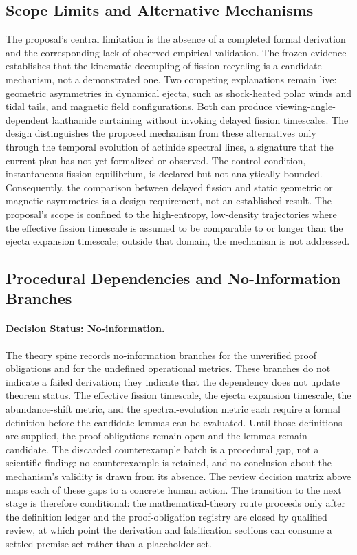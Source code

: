 \documentclass[conference]{IEEEtran}
\begin{document}
\subsection{Scope Limits and Alternative Mechanisms}
The proposal's central limitation is the absence of a completed formal derivation and the corresponding lack of observed empirical validation. The frozen evidence establishes that the kinematic decoupling of fission recycling is a candidate mechanism, not a demonstrated one. Two competing explanations remain live: geometric asymmetries in dynamical ejecta, such as shock-heated polar winds and tidal tails, and magnetic field configurations. Both can produce viewing-angle-dependent lanthanide curtaining without invoking delayed fission timescales. The design distinguishes the proposed mechanism from these alternatives only through the temporal evolution of actinide spectral lines, a signature that the current plan has not yet formalized or observed. The control condition, instantaneous fission equilibrium, is declared but not analytically bounded. Consequently, the comparison between delayed fission and static geometric or magnetic asymmetries is a design requirement, not an established result. The proposal's scope is confined to the high-entropy, low-density trajectories where the effective fission timescale is assumed to be comparable to or longer than the ejecta expansion timescale; outside that domain, the mechanism is not addressed.

\subsection{Procedural Dependencies and No-Information Branches}
\paragraph{Decision Status: No-information.} The theory spine records no-information branches for the unverified proof obligations and for the undefined operational metrics. These branches do not indicate a failed derivation; they indicate that the dependency does not update theorem status. The effective fission timescale, the ejecta expansion timescale, the abundance-shift metric, and the spectral-evolution metric each require a formal definition before the candidate lemmas can be evaluated. Until those definitions are supplied, the proof obligations remain open and the lemmas remain candidate. The discarded counterexample batch is a procedural gap, not a scientific finding: no counterexample is retained, and no conclusion about the mechanism's validity is drawn from its absence. The review decision matrix above maps each of these gaps to a concrete human action. The transition to the next stage is therefore conditional: the mathematical-theory route proceeds only after the definition ledger and the proof-obligation registry are closed by qualified review, at which point the derivation and falsification sections can consume a settled premise set rather than a placeholder set.
\end{document}

